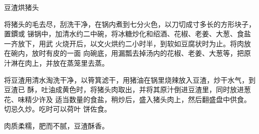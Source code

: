 \begin{recipe}{豆渣烘猪头}

\ingredients


\preparation

将猪头的毛去尽，刮洗干净，在锅内煮到七分火色，以刀切成寸多长的方形块子，置鏆或
锑锅中，加清水约二中碗，将冰糖炒化和绍酒、花椒、老姜、大葱、食盐一齐放下，用武
火烧开后，以文火烘约二小时半，到软如豆腐状时为止。将肉放在碗内，放时有皮的一面
向碗底，用漏瓢去掉汤内的花椒、老姜、大葱等，把原汁淋在肉上，并放在蒸笼里去蒸。

将豆渣用清水淘洗干净，以筲箕滤干，用猪油在锅里烧辣放入豆渣，炒干水气，到豆渣已
酥，吐油成黄色时，将猪头肉取出，并将其原汁倒进豆渣里，同时放进葱花、味精少许及
适当数量的食盐，稍炒后，盛入猪头肉上，然后翻盛盘中供食。切忌久炒。吃时可以荷叶
饼佐食。

\features

肉质柔糯，肥而不腻，豆渣酥香。

\end{recipe}

